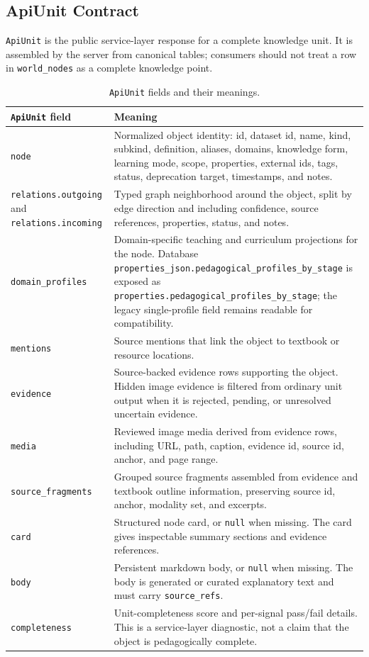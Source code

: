 \documentclass[11pt,letterpaper]{article}
\newcommand{\code}[1]{\nolinkurl{#1}}
\begin{document}
\subsection{ApiUnit Contract}

\code{ApiUnit} is the public service-layer response for a complete knowledge unit. It is assembled by the server from canonical tables; consumers should not treat a row in \code{world_nodes} as a complete knowledge point.

\begin{table}[H]
\centering
\small
\begin{tabularx}{\textwidth}{@{}p{}Y@{}}
\toprule
\code{ApiUnit} field & Meaning\\
\midrule
\code{node} & Normalized object identity: id, dataset id, name, kind, subkind, definition, aliases, domains, knowledge form, learning mode, scope, properties, external ids, tags, status, deprecation target, timestamps, and notes.\\
\code{relations.outgoing} and \code{relations.incoming} & Typed graph neighborhood around the object, split by edge direction and including confidence, source references, properties, status, and notes.\\
\code{domain_profiles} & Domain-specific teaching and curriculum projections for the node. Database \code{properties_json.pedagogical_profiles_by_stage} is exposed as \code{properties.pedagogical_profiles_by_stage}; the legacy single-profile field remains readable for compatibility.\\
\code{mentions} & Source mentions that link the object to textbook or resource locations.\\
\code{evidence} & Source-backed evidence rows supporting the object. Hidden image evidence is filtered from ordinary unit output when it is rejected, pending, or unresolved uncertain evidence.\\
\code{media} & Reviewed image media derived from evidence rows, including URL, path, caption, evidence id, source id, anchor, and page range.\\
\code{source_fragments} & Grouped source fragments assembled from evidence and textbook outline information, preserving source id, anchor, modality set, and excerpts.\\
\code{card} & Structured node card, or \code{null} when missing. The card gives inspectable summary sections and evidence references.\\
\code{body} & Persistent markdown body, or \code{null} when missing. The body is generated or curated explanatory text and must carry \code{source_refs}.\\
\code{completeness} & Unit-completeness score and per-signal pass/fail details. This is a service-layer diagnostic, not a claim that the object is pedagogically complete.\\
\bottomrule
\end{tabularx}
\caption{\code{ApiUnit} fields and their meanings.}
\label{tab:apiunit-fields}
\end{table}
\end{document}

